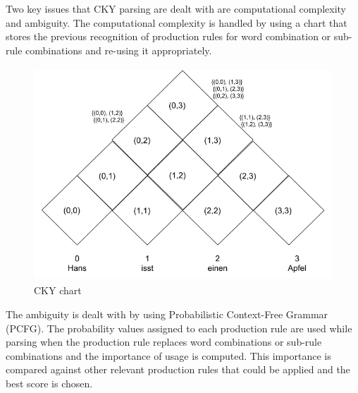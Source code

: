\documentclass[a4paper, 11pt]{article}
\begin{document}
Two key issues that CKY parsing are dealt with are computational complexity and ambiguity. The computational complexity is handled by using a chart that stores the previous recognition of production rules for word combination or sub-rule combinations and re-using it appropriately. 

\begin{figure}[H]
    \centering
    \includegraphics[width=\textwidth,height=8cm, keepaspectratio=true]
    {cky-parsing-chart-1.png}
    \caption{
        CKY chart
    }
    \label{fig:cky_parser_1}
\end{figure}

The ambiguity is dealt with by using Probabilistic Context-Free Grammar (PCFG). The probability values assigned to each production rule are used while parsing when the production rule replaces word combinations or sub-rule combinations and the importance of usage is computed. This importance is compared against other relevant production rules that could be applied and the best score is chosen.
\end{document}
